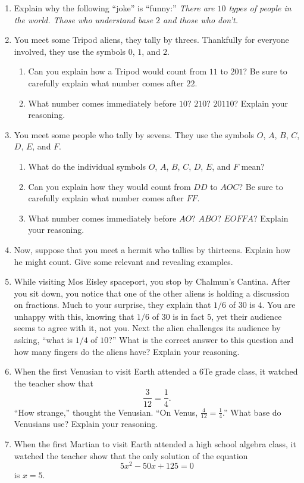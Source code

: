 \begin{problems}
\begin{enumerate}
\item Explain why the following ``joke'' is ``funny:'' \textit{There
  are $10$ types of people in the world. Those who understand base $2$
  and those who don't.}
\item You meet some Tripod aliens, they tally by threes. Thankfully
  for everyone involved, they use the symbols $0$, $1$, and $2$. 
\begin{enumerate}
\item Can you explain how a Tripod would count from $11$ to $201$? Be
  sure to carefully explain what number comes after $22$.
\item What number comes immediately before $10$?  $210$? $20110$?
  Explain your reasoning.
\end{enumerate}
\item You meet some people who tally by sevens. They use the symbols
  $O$, $A$, $B$, $C$, $D$, $E$, and $F$. 
\begin{enumerate}
\item What do the individual symbols $O$, $A$, $B$, $C$, $D$, $E$, and
  $F$ mean?
\item Can you explain how they would count from $DD$ to $AOC$? Be sure
  to carefully explain what number comes after $FF$.
\item What number comes immediately before $AO$?  $ABO$? $EOFFA$?
  Explain your reasoning.
\end{enumerate}
\item Now, suppose that you meet a hermit who tallies by
  thirteens. Explain how he might count. Give some relevant and
  revealing examples.
\item While visiting Mos Eisley spaceport, you stop by Chalmun's
  Cantina. After you sit down, you notice that one of the other aliens
  is holding a discussion on fractions. Much to your surprise, they
  explain that $1/6$ of $30$ is $4$. You are unhappy with this,
  knowing that $1/6$ of $30$ is in fact $5$, yet their audience seems
  to agree with it, not you. Next the alien challenges its audience by
  asking, ``what is $1/4$ of $10$?'' What is the correct answer to
  this question and how many fingers do the aliens have? Explain your
  reasoning.
\item When the first Venusian to visit Earth attended a 6Te grade
  class, it watched the teacher show that
\[
\frac{3}{12} = \frac{1}{4}.
\]
``How strange,'' thought the Venusian. ``On Venus, $\frac{4}{12} =
\frac{1}{4}$.'' What base do Venusians use? Explain your reasoning.
\item When the first Martian to visit Earth attended a high school
  algebra class, it watched the teacher show that the only solution of
  the equation
\[
5x^2-50x+125 = 0
\]
is $x = 5$.


\end{enumerate}
\end{problems}
